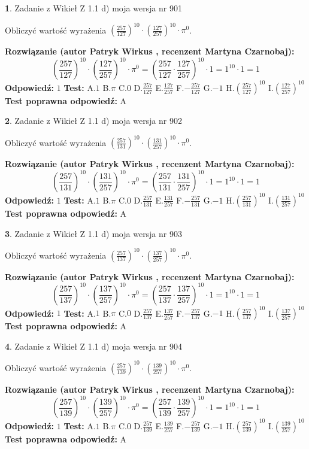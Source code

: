 \documentclass[12pt, a4paper]{article}
\theoremstyle{definition} %
\newtheorem{zad}{}
\newcommand{\zadStart}[1]{\begin{zad}#1\newline}
\newcommand{\zadStop}{\end{zad}}
\newcommand{\rozwStart}[2]{\noindent \textbf{Rozwiązanie (autor #1 , recenzent #2): }\newline}
\newcommand{\rozwStop}{\newline}
\newcommand{\odpStart}{\noindent \textbf{Odpowiedź:}\newline}
\newcommand{\odpStop}{\newline}
\newcommand{\testStart}{\noindent \textbf{Test:}\newline}
\newcommand{\testStop}{\newline}
\newcommand{\kluczStart}{\noindent \textbf{Test poprawna odpowiedź:}\newline}
\newcommand{\kluczStop}{\newline}
\begin{document}
\zadStart{Zadanie z Wikieł Z 1.1 d) moja wersja nr 901}

Obliczyć wartość wyrażenia $(\frac{257}{127})^{10} \cdot (\frac{127}{257})^{10} \cdot \pi^{0}$.
\zadStop
\rozwStart{Patryk Wirkus}{Martyna Czarnobaj}
$$(\frac{257}{127})^{10} \cdot (\frac{127}{257})^{10} \cdot \pi^{0} = (\frac{257}{127} \cdot \frac{127}{257})^{10} \cdot 1 = 1^{10} \cdot 1 = 1$$
\rozwStop
\odpStart
$1$
\odpStop
\testStart
A.$1$ B.$\pi$ C.$0$ D.$\frac{257}{127}$ E.$\frac{127}{257}$
F.$-\frac{257}{127}$ G.$-1$
H.$(\frac{257}{127})^{10}$
I.$(\frac{127}{257})^{10}$
\testStop
\kluczStart
A
\kluczStop



\zadStart{Zadanie z Wikieł Z 1.1 d) moja wersja nr 902}

Obliczyć wartość wyrażenia $(\frac{257}{131})^{10} \cdot (\frac{131}{257})^{10} \cdot \pi^{0}$.
\zadStop
\rozwStart{Patryk Wirkus}{Martyna Czarnobaj}
$$(\frac{257}{131})^{10} \cdot (\frac{131}{257})^{10} \cdot \pi^{0} = (\frac{257}{131} \cdot \frac{131}{257})^{10} \cdot 1 = 1^{10} \cdot 1 = 1$$
\rozwStop
\odpStart
$1$
\odpStop
\testStart
A.$1$ B.$\pi$ C.$0$ D.$\frac{257}{131}$ E.$\frac{131}{257}$
F.$-\frac{257}{131}$ G.$-1$
H.$(\frac{257}{131})^{10}$
I.$(\frac{131}{257})^{10}$
\testStop
\kluczStart
A
\kluczStop



\zadStart{Zadanie z Wikieł Z 1.1 d) moja wersja nr 903}

Obliczyć wartość wyrażenia $(\frac{257}{137})^{10} \cdot (\frac{137}{257})^{10} \cdot \pi^{0}$.
\zadStop
\rozwStart{Patryk Wirkus}{Martyna Czarnobaj}
$$(\frac{257}{137})^{10} \cdot (\frac{137}{257})^{10} \cdot \pi^{0} = (\frac{257}{137} \cdot \frac{137}{257})^{10} \cdot 1 = 1^{10} \cdot 1 = 1$$
\rozwStop
\odpStart
$1$
\odpStop
\testStart
A.$1$ B.$\pi$ C.$0$ D.$\frac{257}{137}$ E.$\frac{137}{257}$
F.$-\frac{257}{137}$ G.$-1$
H.$(\frac{257}{137})^{10}$
I.$(\frac{137}{257})^{10}$
\testStop
\kluczStart
A
\kluczStop



\zadStart{Zadanie z Wikieł Z 1.1 d) moja wersja nr 904}

Obliczyć wartość wyrażenia $(\frac{257}{139})^{10} \cdot (\frac{139}{257})^{10} \cdot \pi^{0}$.
\zadStop
\rozwStart{Patryk Wirkus}{Martyna Czarnobaj}
$$(\frac{257}{139})^{10} \cdot (\frac{139}{257})^{10} \cdot \pi^{0} = (\frac{257}{139} \cdot \frac{139}{257})^{10} \cdot 1 = 1^{10} \cdot 1 = 1$$
\rozwStop
\odpStart
$1$
\odpStop
\testStart
A.$1$ B.$\pi$ C.$0$ D.$\frac{257}{139}$ E.$\frac{139}{257}$
F.$-\frac{257}{139}$ G.$-1$
H.$(\frac{257}{139})^{10}$
I.$(\frac{139}{257})^{10}$
\testStop
\kluczStart
A
\kluczStop
\end{document}
